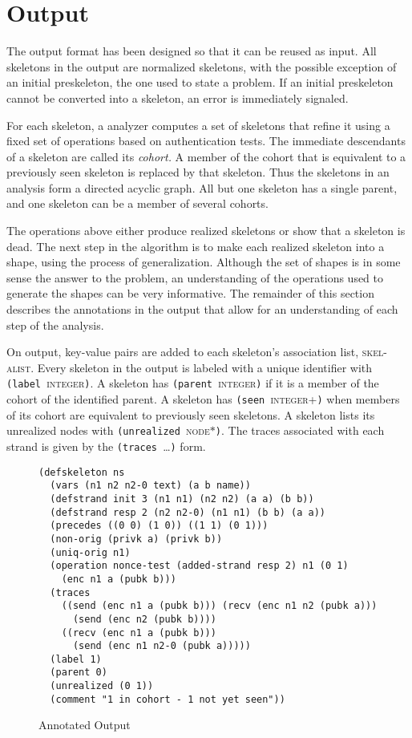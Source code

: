 \documentclass[12pt]{article}
\begin{document}
\section{Output}\label{sec:output}

The {\cpsa} output format has been designed so that it can be reused
as input.  All skeletons in the output are normalized skeletons,
with the possible exception of an initial preskeleton, the one used to
state a problem.  If an initial preskeleton cannot be converted into a
skeleton, an error is immediately signaled.

For each skeleton, a {\cpsa} analyzer computes a set of skeletons that
refine it using a fixed set of operations based on authentication
tests.  The immediate descendants of a skeleton are called its
\emph{cohort.}  A member of the cohort that is
equivalent to a previously seen skeleton is replaced by that skeleton.
Thus the skeletons in an analysis form a directed acyclic graph.  All
but one skeleton has a single parent, and one skeleton can be a member
of several cohorts.

The operations above either produce realized skeletons or show that a
skeleton is dead.  The next step in the algorithm is to make each
realized skeleton into a shape, using the process of generalization.
Although the set of shapes is in some sense the answer to the problem,
an understanding of the operations used to generate the shapes can be
very informative.  The remainder of this section describes the
annotations in the output that allow for an understanding of each step
of the analysis.

On output, key-value pairs are added to each skeleton's association
list, \textsc{skel-alist}.  Every skeleton in the output is labeled
with a unique identifier with
\texttt{(label~}\textsc{integer}\texttt{)}.  A skeleton
has \texttt{(parent~}\textsc{integer}\texttt{)} if it is a member of
the cohort of the identified parent.  A skeleton has
\texttt{(seen~}\textsc{integer+}\texttt{)} when members of its cohort
are equivalent to previously seen skeletons.  A skeleton lists its
unrealized nodes with
\texttt{(unrealized~}\textsc{node$\ast$}\texttt{)}.  The traces
associated with each strand is given by the
\texttt{(traces~}\ldots\texttt{)} form.

\begin{figure}
\begin{verbatim}
(defskeleton ns
  (vars (n1 n2 n2-0 text) (a b name))
  (defstrand init 3 (n1 n1) (n2 n2) (a a) (b b))
  (defstrand resp 2 (n2 n2-0) (n1 n1) (b b) (a a))
  (precedes ((0 0) (1 0)) ((1 1) (0 1)))
  (non-orig (privk a) (privk b))
  (uniq-orig n1)
  (operation nonce-test (added-strand resp 2) n1 (0 1)
    (enc n1 a (pubk b)))
  (traces
    ((send (enc n1 a (pubk b))) (recv (enc n1 n2 (pubk a)))
      (send (enc n2 (pubk b))))
    ((recv (enc n1 a (pubk b)))
      (send (enc n1 n2-0 (pubk a)))))
  (label 1)
  (parent 0)
  (unrealized (0 1))
  (comment "1 in cohort - 1 not yet seen"))
\end{verbatim}
\caption{Annotated {\cpsa} Output}\label{fig:output}
\end{figure}
\end{document}
